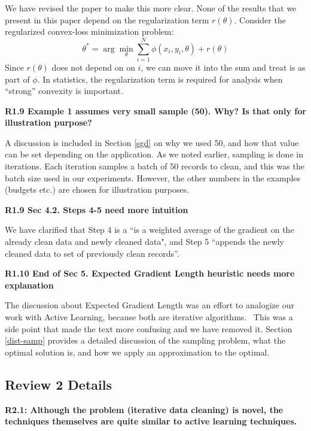 \noindent We have revised the paper to make this more clear.
None of the results that we present in this paper depend on the regularization term $r(\theta)$.
Consider the regularized convex-loss minimization problem:
\[
 \theta^{*}=\arg\min_{\theta}\sum_{i=1}^{N}\phi(x_{i},y_{i},\theta) + r(\theta)
\]
Since $r(\theta)$ does not depend on on $i$, we can move it into the sum and treat is as part of $\phi$.
In statistics, the regularization term is required for analysis when ``strong'' convexity is important.


\vspace{0.5em}

\noindent\textbf{R1.9 Example 1 assumes very small sample (50). Why? Is that only for illustration purpose?}

\noindent  A discussion is included in Section \ref{sgd} on why we used 50, and how that value can be set depending on the application. As we noted earlier, sampling is done in iterations. Each iteration samples a batch of 50 records to clean, and this was the batch size used in our experiments. However, the other numbers in the examples (budgets etc.) are chosen for illustration purposes. 

\vspace{0.5em}

\noindent\textbf{R1.9 Sec 4.2. Steps 4-5 need more intuition}

\noindent  We have clarified that Step 4 is a ``is a weighted average of the gradient on the already clean data and newly cleaned data", and Step 5 ``appends the newly cleaned data to set of previously clean records''.

\vspace{0.5em}

\noindent\textbf{R1.10 End of Sec 5. Expected Gradient Length heuristic needs more explanation}

\noindent  The discussion about Expected Gradient Length was an effort to analogize our work with Active Learning, because both are iterative algorithms.  This was a side point that made the text more confusing and we have removed it.
Section \ref{dist-samp} provides a detailed discussion of the sampling problem, what the optimal solution is, and how we apply an approximation to the optimal.

\subsection*{Review 2 Details}

\noindent\textbf{R2.1: Although the problem (iterative data cleaning) is novel, the techniques themselves are quite similar to active learning techniques.}

